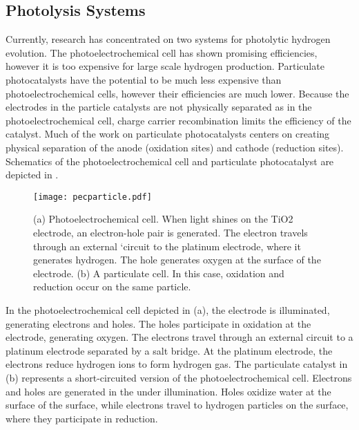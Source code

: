\subsection{Photolysis Systems}
\label{subsec:background.systems}

Currently, research has concentrated on two systems for photolytic hydrogen evolution. The photoelectrochemical cell has shown promising efficiencies,\cite{Fujishima:1972hc,User:2001tg} however it is too expensive for large scale hydrogen production. Particulate photocatalysts have the potential to be much less expensive than photoelectrochemical cells, however their efficiencies are much lower. \cite{Kaneko:2002vh} Because the electrodes in the particle catalysts are not physically separated as in the photoelectrochemical cell, charge carrier recombination limits the efficiency of the catalyst. Much of the work on particulate photocatalysts centers on creating physical separation of the anode (oxidation sites) and cathode (reduction sites).\cite{Kitano:2008io,Kudo:2008fk} Schematics of the photoelectrochemical cell and particulate photocatalyst are depicted in .

\begin{figure}
	\texttt{[image: pecparticle.pdf]}
	\caption[Photoelectrochemical and particulate cells]{%
		(a) Photoelectrochemical cell. When light shines on the TiO2 
		electrode, an electron-hole pair is generated. The electron 
		travels through an external `circuit to the platinum electrode, 
		where it generates hydrogen. The hole generates oxygen at the 
		surface of the  electrode. (b) A particulate cell. 
		In this case, oxidation and reduction occur on the same particle.}
	\label{fig:pecparticle}
\end{figure}

In the photoelectrochemical cell depicted in (a), the  electrode is illuminated, generating electrons and holes. The holes participate in oxidation at the  electrode, generating oxygen. The electrons travel through an external circuit to a platinum electrode separated by a salt bridge. At the platinum electrode, the electrons reduce hydrogen ions to form hydrogen gas. The particulate catalyst in (b) represents a short-circuited version of the photoelectrochemical cell. Electrons and holes are generated in the  under illumination. Holes oxidize water at the surface of the  surface, while electrons travel to hydrogen particles on the surface, where they participate in reduction.



